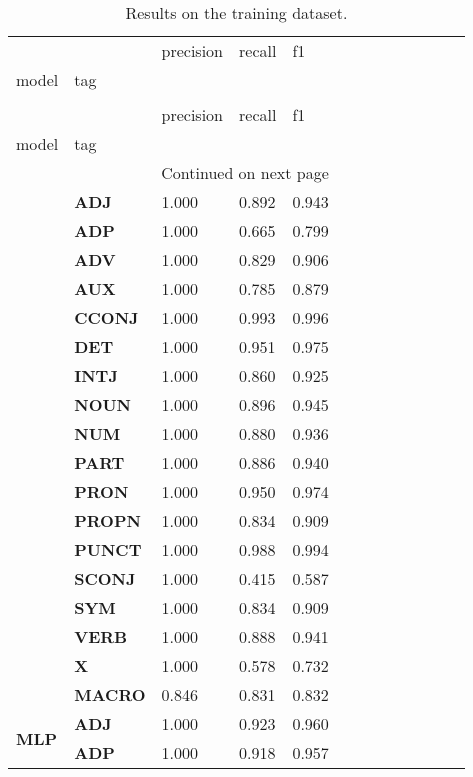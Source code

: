 \begin{longtable}{|l||l||l||l||l||l||l||l||l||l||l||l||l|}
\caption{Results on the training dataset.} \label{tab::ex_3_train} \\
\toprule
 &  & precision & recall & f1 \\
model & tag &  &  &  \\
\midrule
\endfirsthead
\caption[]{Results on the training dataset.} \\
\toprule
 &  & precision & recall & f1 \\
model & tag &  &  &  \\
\midrule
\endhead
\midrule
\multicolumn{5}{r}{Continued on next page} \\
\midrule
\endfoot
\bottomrule
\endlastfoot
\multirow[t]{18}{*}{\textbf{Baseline}} & \textbf{ADJ} & 1.000 & 0.892 & 0.943 \\
\textbf{} & \textbf{ADP} & 1.000 & 0.665 & 0.799 \\
\textbf{} & \textbf{ADV} & 1.000 & 0.829 & 0.906 \\
\textbf{} & \textbf{AUX} & 1.000 & 0.785 & 0.879 \\
\textbf{} & \textbf{CCONJ} & 1.000 & 0.993 & 0.996 \\
\textbf{} & \textbf{DET} & 1.000 & 0.951 & 0.975 \\
\textbf{} & \textbf{INTJ} & 1.000 & 0.860 & 0.925 \\
\textbf{} & \textbf{NOUN} & 1.000 & 0.896 & 0.945 \\
\textbf{} & \textbf{NUM} & 1.000 & 0.880 & 0.936 \\
\textbf{} & \textbf{PART} & 1.000 & 0.886 & 0.940 \\
\textbf{} & \textbf{PRON} & 1.000 & 0.950 & 0.974 \\
\textbf{} & \textbf{PROPN} & 1.000 & 0.834 & 0.909 \\
\textbf{} & \textbf{PUNCT} & 1.000 & 0.988 & 0.994 \\
\textbf{} & \textbf{SCONJ} & 1.000 & 0.415 & 0.587 \\
\textbf{} & \textbf{SYM} & 1.000 & 0.834 & 0.909 \\
\textbf{} & \textbf{VERB} & 1.000 & 0.888 & 0.941 \\
\textbf{} & \textbf{X} & 1.000 & 0.578 & 0.732 \\
\textbf{} & \textbf{MACRO} & 0.846 & 0.831 & 0.832 \\
\cline{1-5}
\multirow[t]{18}{*}{\textbf{MLP}} & \textbf{ADJ} & 1.000 & 0.923 & 0.960 \\
\textbf{} & \textbf{ADP} & 1.000 & 0.918 & 0.957 \\

\end{longtable}
